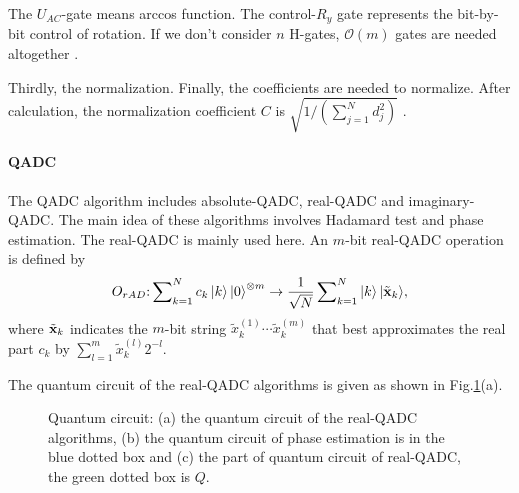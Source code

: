 \documentclass[%
 reprint,
 amsmath,amssymb,
pra,
]{revtex4-1}
\begin{document}
The ${U_{AC}}$-gate means arccos function. The control-${R_y}$ gate represents the bit-by-bit control of rotation. If we don't consider $n$ H-gates, $\mathcal{O}(m)$ gates are needed altogether \cite{mitarai2019quantum}.

Thirdly, the normalization. Finally, the coefficients are needed to normalize. After calculation, the normalization coefficient $C$ is $\sqrt {1/\left( {\sum\nolimits_{j = 1}^N {d_j^2} } \right)} $ \cite{mitarai2019quantum}.


\paragraph{QADC}

The QADC algorithm includes absolute-QADC, real-QADC and imaginary-QADC.
The main idea of these algorithms involves Hadamard test and phase estimation. The real-QADC is mainly used here. An $m$-bit real-QADC operation is defined by 
\begin{equation}
{O_{rAD}}{\rm{:}}\sum\nolimits_{k = 1}^N {{c_k}\left| k \right\rangle {{\left| 0 \right\rangle }^{ \otimes m}}}  \to \frac{1}{{\sqrt N }}\sum\nolimits_{k = 1}^N {\left| k \right\rangle \left| {{{\tilde{\textbf x} }_k}} \right\rangle } ,
\end{equation}
where ${\tilde {\textbf x}_k}$ indicates the $m$-bit string $\tilde x_k^{\left( 1 \right)} \cdots \tilde x_k^{\left( m \right)}$ that best approximates the real part ${c_k}$ by $\sum\nolimits_{l = 1}^m {\tilde x_k^{\left( l \right)}{2^{ - l}}} $.

The quantum circuit of the real-QADC algorithms is given as shown in Fig.\ref{QADC_fig}(a).

\begin{figure}[htbp]
 \caption{Quantum circuit: (a) the quantum circuit of the real-QADC algorithms, 
 (b) the quantum circuit of phase estimation is in the blue dotted box
 and (c) the part of quantum circuit of real-QADC, the green dotted box is $Q$.}
 \label{QADC_fig}
\end{figure}
\end{document}
